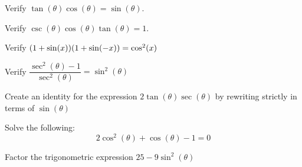 \documentclass[../mathNotesPreamble]{subfiles}
\begin{document}
  \begin{ex*}
    Verify $\tan(\theta)\cos(\theta)=\sin(\theta)$. 

    Verify $\csc(\theta)\cos(\theta)\tan(\theta)=1$. 
    
    Verify ${\left(1+\sin(x)\right)}{\left(1+\sin(-x)\right)}=\cos^2(x)$ 
    
    Verify $\dfrac{\sec^2(\theta)-1}{\sec^2(\theta)}=\sin^2(\theta)$ 
  \end{ex*}
  \pagebreak

  \begin{ex*}
    Create an identity for the expression $2\tan(\theta) \sec(\theta)$ by rewriting strictly in terms of $\sin(\theta)$ 
  \end{ex*}

  \begin{ex*}
    Solve the following:
      \[2\cos^2(\theta)+\cos(\theta)-1=0\]
  \end{ex*}

  \begin{ex*}
    Factor the trigonometric expression $25-9\sin^2(\theta)$
  \end{ex*}

  \pagebreak
\end{document}
